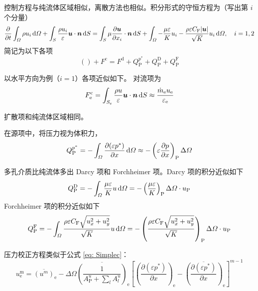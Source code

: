 控制方程与纯流体区域相似，离散方法也相似。积分形式的守恒方程为（写出第 $i$ 个分量）
\begin{equation}\label{eq: porous conservation}
	\frac{\partial}{\partial t}\int_{\varOmega}\rho u_i\,\mathrm{d}\varOmega +
	\int_S\frac{\rho u_i}{\varepsilon}\bm{u}\cdot\bm{n}\,\mathrm{d} S =
	\int_S\mu\frac{\partial\bm{u}}{\partial x_i}\cdot\bm{n}\,\mathrm{d} S +
	\int_{\varOmega} - \frac{\mu\varepsilon}{K}u_i - 
	\frac{\rho\varepsilon C_{\mathrm{F}}\lvert\bm{u}\vert}{\sqrt K}u_i \,\mathrm{d}\varOmega, \quad i=1,2
\end{equation}
简记为以下各项
\begin{equation}
	() + F^{\mathrm{c}} = F^{\mathrm{d}} + Q_{\mathrm{P}}^{p^*} + Q_{\mathrm{P}}^{\mathrm{D}} + Q_{\mathrm{P}}^{\mathrm{F}}
\end{equation}

以水平方向为例（$i=1$）各项近似如下。
对流项为
\begin{equation}
	F_{\mathrm{e}}^{\mathrm{c}} = 
	\int_{S_{\mathrm{e}}}\frac{\rho u}{\varepsilon}\bm{u}\cdot\bm{n}\,\mathrm{d} S \approx \frac{\dot m_{\mathrm{e}} u_{\mathrm{e}}}{\varepsilon_{\mathrm{e}}}
\end{equation}

扩散项和纯流体区域相同。

在源项中，将压力视为体积力，
\begin{equation}
	Q_{\mathrm{P}}^{p^*} = 
	-\int_{\varOmega} \frac{\partial(\varepsilon p^*)}{\partial x} \,\mathrm{d}\varOmega \approx 
	-\left(\varepsilon \frac{\partial p}{\partial x}\right)_{\mathrm{P}} \Delta\varOmega
\end{equation}

多孔介质比纯流体多出 Darcy 项和 Forchheimer 项。Darcy 项的积分近似如下
\begin{equation}
	Q_{\mathrm{P}}^{\mathrm{D}} = 
	-\int_{\varOmega} \frac{\mu\varepsilon}{K}u \,\mathrm{d}\varOmega = 
	-\left(\frac{\mu\varepsilon}{K}\right)_{\mathrm{P}} \Delta\varOmega\cdot u_{\mathrm{P}}
\end{equation}
Forchheimer 项的积分近似如下
\begin{equation}
	Q_{\mathrm{P}}^{\mathrm{F}} = -\int_{\varOmega} \frac{\rho\varepsilon C_{\mathrm{F}}\sqrt{u_x^2+u_y^2}}{\sqrt K} u\,\mathrm{d}\varOmega = -\left(\frac{\rho\varepsilon C_{\mathrm{F}}\sqrt{u_x^2+u_y^2}}{\sqrt K}\right)_{\mathrm{P}} \Delta\varOmega\cdot u_{\mathrm{P}}
\end{equation}

压力校正方程类似于公式 \eqref{eq: Simplec}：
\begin{equation}
	u_{\mathrm{e}}^{\mathrm{m}} = \overline{(u^m)}_{\mathrm{e}} - \Delta\varOmega \overline{\left(\frac{1}{A_{\mathrm{P}}^u+\sum_lA_l^u}\right)}_{\mathrm{e}} \left[\left(\frac{\partial(\varepsilon p^*)}{\partial x}\right)_{\mathrm{e}}-\overline{\left(\frac{\partial(\varepsilon p^*)}{\partial x}\right)}_{\mathrm{e}}\right]^{m-1}
\end{equation}

